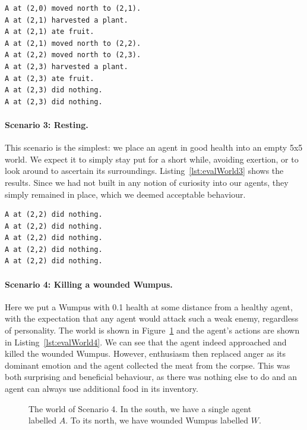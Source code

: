 \begin{lstlisting}[caption=Actions in Scenario 2., label=lst:evalWorld2, float=t]
A at (2,0) moved north to (2,1).
A at (2,1) harvested a plant.
A at (2,1) ate fruit.
A at (2,1) moved north to (2,2).
A at (2,2) moved north to (2,3).
A at (2,3) harvested a plant.
A at (2,3) ate fruit.
A at (2,3) did nothing.
A at (2,3) did nothing.
\end{lstlisting}

\paragraph{Scenario 3: Resting.} This scenario is the simplest: we place an agent in good health into an empty 5x5 world. We expect it to simply stay put for a short while, avoiding exertion, or to look around to ascertain its surroundings. Listing~\ref{lst:evalWorld3} shows the results. Since we had not built in any notion of curiosity into our agents, they simply remained in place, which we deemed acceptable behaviour.

\begin{lstlisting}[caption=Actions in Scenario 3., label=lst:evalWorld3, float=t]
A at (2,2) did nothing.
A at (2,2) did nothing.
A at (2,2) did nothing.
A at (2,2) did nothing.
A at (2,2) did nothing.
\end{lstlisting}

\paragraph{Scenario 4: Killing a wounded Wumpus.} Here we put a Wumpus with 0.1 health at some distance from a healthy agent, with the expectation that any agent would attack such a weak enemy, regardless of personality. The world is shown in Figure~\ref{fig:evalWorld4} and the agent's actions are shown in Listing~\ref{lst:evalWorld4}. We can see that the agent indeed approached and killed the wounded Wumpus. However, enthusiasm then replaced anger as its dominant emotion and the agent collected the meat from the corpse. This was both surprising and beneficial behaviour, as there was nothing else to do and an agent can always use additional food in its inventory.

\begin{figure}[t]
	\centering
	
	\caption{The world of Scenario 4. In the south, we have a single agent labelled $A$. To its north, we have wounded Wumpus labelled $W$.}
	\label{fig:evalWorld4}
\end{figure}

